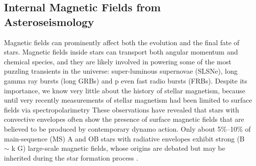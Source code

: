 \subsection{Internal Magnetic Fields from Asteroseismology}

Magnetic fields can prominently affect both the evolution and the final fate of stars. Magnetic fields inside stars can transport both angular momentum and chemical species, and they are likely involved in powering some of the most puzzling transients in the universe: super-luminous supernovae (SLSNe), long gamma ray bursts (long GRBs) and p even fast radio bursts (FRBs). Despite its importance, we know very little about the history of stellar magnetism, because until very recently measurements of stellar magnetism had been limited to surface fields via spectropolarimetry
{\color{green} These observations have revealed that stars with convective envelopes often show the presence of surface magnetic fields that are believed to be produced by contemporary dynamo action. Only about 5\%–10\% of main-sequence (MS) A and OB stars with radiative envelopes exhibit strong (B $\sim$ k G) large-scale magnetic fields, whose origins are debated but may be inherited during the star formation process \citep[fossil fields, see e.g.,][]{2012ASPC..464..405W}.}